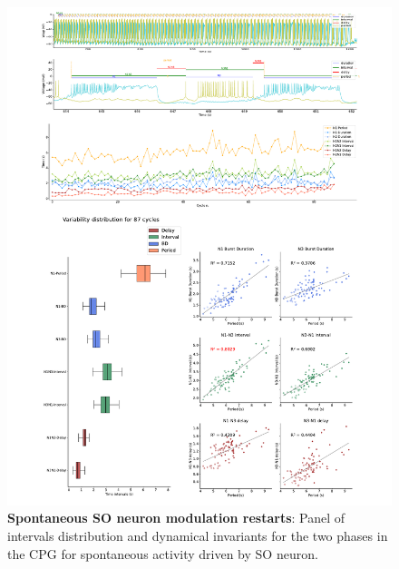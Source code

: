 \begin{figure}[htbp]
	\centering
	\includegraphics[width=\textwidth]{./invariants/data/SUSSEX/prep4_so_driven_2/images/panel_with_intervals.pdf}
	\caption{\textbf{Spontaneous SO neuron modulation restarts}: Panel of intervals distribution and dynamical invariants for the two phases in the CPG for spontaneous activity driven by SO neuron.}
	\label{fig:so spontaneous invariants 1}
\end{figure}




